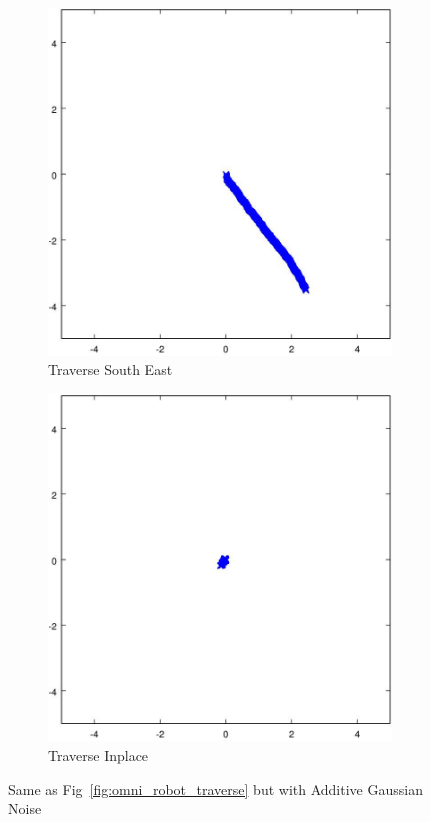 \documentclass{article}
\begin{document}
\begin{figure}[H]
	\begin{subfigure}[b]{0.32\linewidth}
		\includegraphics[width=\textwidth]{images/traverse_south_east_with_noise.jpg}
		\caption{Traverse South East}
	\end{subfigure}
	\begin{subfigure}[b]{0.32\linewidth}
		\includegraphics[width=\textwidth]{images/traverse_inplace_with_noise.jpg}
		\caption{Traverse Inplace}
	\end{subfigure}
	
	\caption{Same as Fig~\ref{fig:omni_robot_traverse} but with Additive 
	Gaussian Noise}
	\label{fig:omni_robot_traverse_with_noise}
\end{figure}
\end{document}
